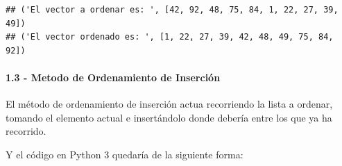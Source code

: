 \documentclass[
]{article}
\begin{document}
\begin{verbatim}
## ('El vector a ordenar es: ', [42, 92, 48, 75, 84, 1, 22, 27, 39, 49])
## ('El vector ordenado es: ', [1, 22, 27, 39, 42, 48, 49, 75, 84, 92])
\end{verbatim}

\hypertarget{metodo-de-ordenamiento-de-inserciuxf3n}{%
\paragraph{1.3 - Metodo de Ordenamiento de
Inserción}\label{metodo-de-ordenamiento-de-inserciuxf3n}}

El método de ordenamiento de inserción actua recorriendo la lista a
ordenar, tomando el elemento actual e insertándolo donde debería entre
los que ya ha recorrido.

Y el código en Python 3 quedaría de la siguiente forma:
\end{document}
